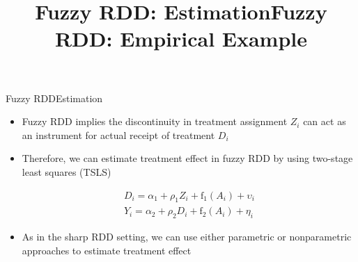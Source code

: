 \documentclass[hyperref={pdfpagelabels=false}]{beamer}
\begin{document}
\title[]  
{Fuzzy RDD: Estimation}


\author 
{}

\institute{}






\date
{}


\begin{frame}{}
	\titlepage
\end{frame}






\begin{frame}{Fuzzy RDD}{Estimation}
	\begin{itemize}
		\item Fuzzy RDD implies the discontinuity in treatment assignment $Z_{i}$ can act as an instrument for actual receipt of treatment $D_{i}$
		\vspace{0.2cm}
		\item Therefore, we can estimate treatment effect in fuzzy RDD by using two-stage least squares (TSLS)
		
		\begin{equation*}
			\begin{aligned}
				D_i=\alpha_{1}+\rho_{1} Z_i+\mathrm{f}_{1}(A_i)+\upsilon_i   \\
				Y_i=\alpha_{2}+\rho_{2} D_i+\mathrm{f}_{2}(A_i)+\eta_i
			\end{aligned}
		\end{equation*}
		
		\item As in the sharp RDD setting, we can use either parametric or nonparametric approaches to estimate treatment effect
		
	\end{itemize}
\end{frame}





\title[]  
{Fuzzy RDD: Empirical Example}


\author 
{}

\institute{}
\end{document}
